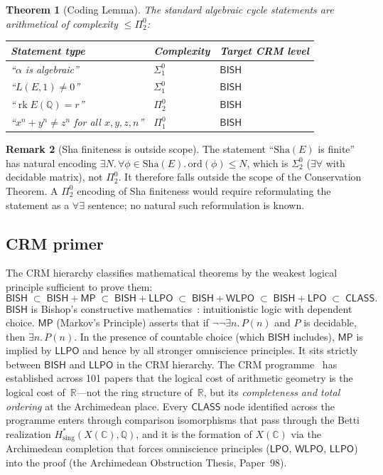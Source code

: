 \documentclass[11pt,a4paper]{article}
\theoremstyle{plain}
\newtheorem{theorem}{Theorem}[section]
\theoremstyle{definition}
\newtheorem{remark}[theorem]{Remark}
\newcommand{\BISH}{\textsf{BISH}}
\newcommand{\WLPO}{\textsf{WLPO}}
\newcommand{\LLPO}{\textsf{LLPO}}
\newcommand{\LPO}{\textsf{LPO}}
\newcommand{\MP}{\textsf{MP}}
\newcommand{\CLASS}{\textsf{CLASS}}
\newcommand{\Q}{\mathbb{Q}}
\newcommand{\R}{\mathbb{R}}
\newcommand{\C}{\mathbb{C}}
\DeclareMathOperator{\rk}{rk}
\begin{document}
\begin{theorem}[Coding Lemma]\label{thm:C}
The standard algebraic cycle statements are arithmetical of complexity $\le \Pi^0_2$:
\begin{center}
\begin{tabular}{lll}
\toprule
\textbf{Statement type} & \textbf{Complexity} & \textbf{Target CRM level} \\
\midrule
``$\alpha$ is algebraic'' & $\Sigma^0_1$ & $\BISH$ \\
``$L(E,1) \ne 0$'' & $\Sigma^0_1$ & $\BISH$ \\
``$\rk E(\Q) = r$'' & $\Pi^0_2$ & $\BISH$ \\
``$x^n + y^n \ne z^n$ for all $x,y,z,n$'' & $\Pi^0_1$ & $\BISH$ \\
\bottomrule
\end{tabular}
\end{center}
\end{theorem}

\begin{remark}[Sha finiteness is outside scope]\label{rem:sha}
The statement ``$\mathrm{Sha}(E)$ is finite'' has natural encoding $\exists N.\, \forall \phi \in \mathrm{Sha}(E).\, \mathrm{ord}(\phi) \le N$, which is $\Sigma^0_2$ ($\exists\forall$ with decidable matrix), not $\Pi^0_2$.  It therefore falls outside the scope of the Conservation Theorem.  A $\Pi^0_2$ encoding of Sha finiteness would require reformulating the statement as a $\forall\exists$ sentence; no natural such reformulation is known.
\end{remark}

\subsection{CRM primer}\label{sec:crm-primer}

The CRM hierarchy classifies mathematical theorems by the weakest logical principle sufficient to prove them:
\[
\BISH \;\subset\; \BISH{+}\MP \;\subset\; \BISH{+}\LLPO \;\subset\; \BISH{+}\WLPO \;\subset\; \BISH{+}\LPO \;\subset\; \CLASS.
\]
$\BISH$ is Bishop's constructive mathematics~\cite{bishop1967}: intuitionistic logic with dependent choice.  $\MP$ (Markov's Principle) asserts that if $\lnot\lnot\exists n.\, P(n)$ and $P$ is decidable, then $\exists n.\, P(n)$.  In the presence of countable choice (which $\BISH$ includes), $\MP$ is implied by $\LLPO$ and hence by all stronger omniscience principles.  It sits strictly between $\BISH$ and $\LLPO$ in the CRM hierarchy.  The CRM programme~\cite{series,lee-format-guide} has established across 101 papers that the logical cost of arithmetic geometry is the logical cost of~$\R$---not the ring structure of~$\R$, but its \emph{completeness and total ordering} at the Archimedean place.  Every $\CLASS$ node identified across the programme enters through comparison isomorphisms that pass through the Betti realization $H^*_{\mathrm{sing}}(X(\C), \Q)$, and it is the formation of $X(\C)$ via the Archimedean completion that forces omniscience principles ($\LPO$, $\WLPO$, $\LLPO$) into the proof (the Archimedean Obstruction Thesis, Paper~98).
\end{document}
